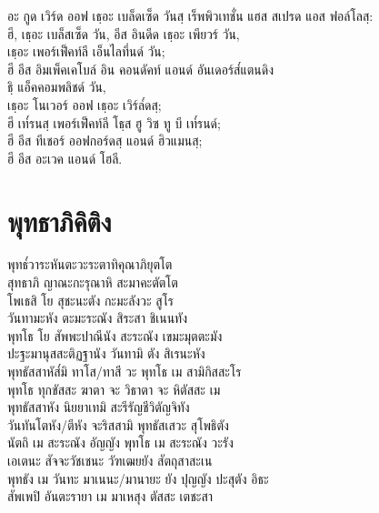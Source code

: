 \begin{english}
อะ กูด เวิร์ด ออฟ เธฺอะ เบล็ดเซ็ด วันสฺ เร็พพิวเทชั่น แฮส สเปรด แอส ฟอล์โลสฺ:\\
ฮี, เธฺอะ เบล็สเซ็ด วัน, อีส อินดีด เธฺอะ เพียวร์ วัน,\\
เธฺอะ เพอร์เฟ็คท์ลี เอ็นไลทึ่นด์ วัน;\\
ฮี อีส อิมเพ็คเคโบล์ อิน คอนดัคท์ แอนด์ อันเดอร์ส๎แตนดิง\\
ธฺิ แอ็คคอมพลิชด์ วัน,\\
เธฺอะ โนเวอร์ ออฟ เธฺอะ เวิร์ล๎ดสฺ;\\
ฮี เท๎รนสฺ เพอร์เฟ็คท์ลี โธฺส ฮู วิซ ทู บี เท๎รนด์;\\
ฮี อีส ทีเชอร์ ออฟกอร์ดสฺ แอนด์ ฮิวแมนสฺ;\\
ฮี อีส อะเวค แอนด์ โฮลี.\\
\end{english}
\clearpage

\chapter{พุทธาภิคิติง}

\begin{leader}
\end{leader}

พุทธ๎วาระหันตะวะระตาทิคุณาภิยุตโต\\
สุทธาภิ ญาณะกะรุณาหิ สะมาคะตัตโต\\
โพเธสิ โย สุชะนะตัง กะมะลังวะ สูโร\\
วันทามะหัง ตะมะระณัง สิระสา ชิเนนทัง\\
พุทโธ โย สัพพะปาณีนัง สะระณัง เขมะมุตตะมัง\\
ปะฐะมานุสสะติฏฐานัง วันทามิ ตัง สิเรนะหัง\\
พุทธัสสาหัส๎มิ ทาโส/ทาสี วะ พุทโธ เม สามิกิสสะโร\\
พุทโธ ทุกขัสสะ ฆาตา จะ วิธาตา จะ หิตัสสะ เม\\
พุทธัสสาหัง นิยยาเทมิ สะรีรัญชีวิตัญจิทัง\\
วันทันโตหัง/ตีหัง จะริสสามิ พุทธัสเสวะ สุโพธิตัง\\
นัตถิ เม สะระณัง อัญญัง พุทโธ เม สะระณัง วะรัง\\
เอเตนะ สัจจะวัชเชนะ วัฑเฒยยัง สัตถุสาสะเน\\
พุทธัง เม วันทะ มาเนนะ/มานายะ ยัง ปุญญัง ปะสุตัง อิธะ\\
สัพเพปิ อันตะรายา เม มาเหสุง ตัสสะ เตชะสา\\


